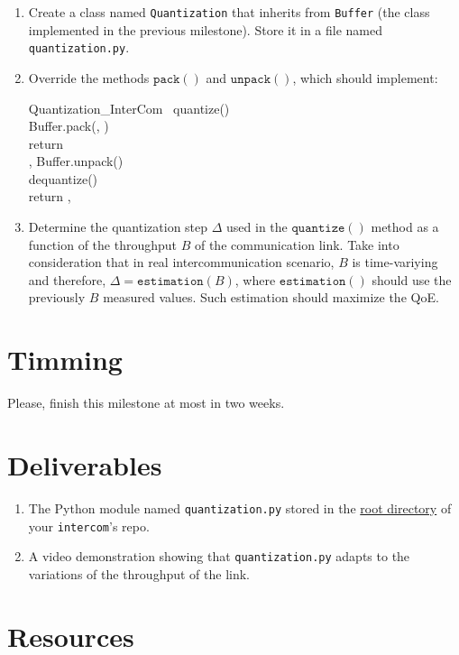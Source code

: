 \begin{enumerate}
\item Create a class named \texttt{Quantization} that inherits from
  \texttt{Buffer} (the class implemented in the previous
  milestone). Store it in a file named \texttt{quantization.py}.
\item Override the methods $\mathtt{pack()}$ and $\mathtt{unpack()}$,
  which should implement:

\begin{pseudocode}{Quantization\_InterCom}{~}
  \BEGIN
     \GETS quantize()\\
     \GETS Buffer.pack(, )\\
    return \\
  \END
  \ENDPROCEDURE
  \BEGIN
    ,  \GETS Buffer.unpack()\\
     \GETS dequantize()\\
    return , 
  \END
  \ENDPROCEDURE
\end{pseudocode}

\item Determine the quantization step $\Delta$ used in the
  $\mathtt{quantize()}$ method as a function of the throughput $B$ of
  the communication link. Take into consideration that in real
  intercommunication scenario, $B$ is time-variying and therefore,
  $\Delta = \mathtt{estimation}(B)$, where $\mathtt{estimation()}$
  should use the previously $B$ measured values. Such estimation
  should maximize the QoE.
\end{enumerate}

\section{Timming}

Please, finish this milestone at most in two weeks.

\section{Deliverables}

\begin{enumerate}
  \item The Python module named \texttt{quantization.py} stored in the
    \href{https://github.com/Tecnologias-multimedia/intercom}{root
      directory} of your \texttt{intercom}'s repo.
  \item A video demonstration showing that \texttt{quantization.py}
    adapts to the variations of the throughput of the link.
\end{enumerate}

\section{Resources}



